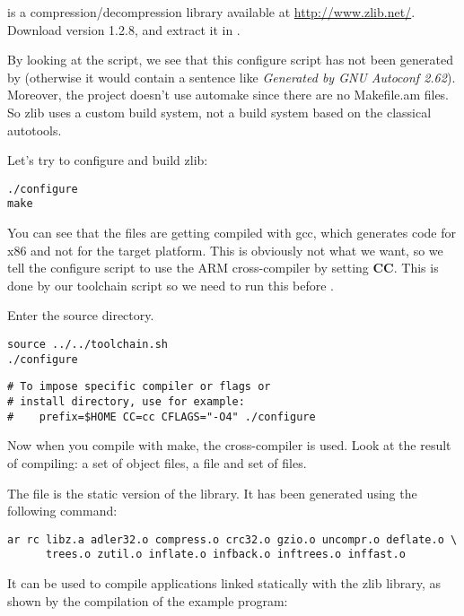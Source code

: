  is a compression/decompression library available at
\url{http://www.zlib.net/}. Download version 1.2.8, and extract it in
.

By looking at the  script, we see that this configure
script has not been generated by  (otherwise it would
contain a sentence like {\em Generated by GNU Autoconf
  2.62}). Moreover, the project doesn't use automake since there are
no Makefile.am files. So zlib uses a custom build system, not a build
system based on the classical autotools.

Let's try to configure and build zlib:

\begin{verbatim}
./configure
make
\end{verbatim}

You can see that the files are getting compiled with gcc, which
generates code for x86 and not for the target platform. This is
obviously not what we want, so we tell the configure script to use the
ARM cross-compiler by setting {\bf CC}. This is done by our toolchain script
so we need to run this before .

Enter the  source directory.

\begin{verbatim}
source ../../toolchain.sh
./configure
\end{verbatim}

\begin{verbatim}
# To impose specific compiler or flags or
# install directory, use for example:
#    prefix=$HOME CC=cc CFLAGS="-O4" ./configure
\end{verbatim}

Now when you compile with make, the cross-compiler is used. Look at
the result of compiling: a set of object files, a file 
and set of  files.

The  file is the static version of the library. It has
been generated using the following command:

\begin{verbatim}
ar rc libz.a adler32.o compress.o crc32.o gzio.o uncompr.o deflate.o \
      trees.o zutil.o inflate.o infback.o inftrees.o inffast.o
\end{verbatim}

It can be used to compile applications linked statically with the zlib
library, as shown by the compilation of the example program:


